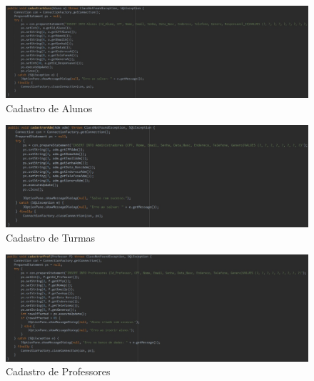 \documentclass[main.tex]{subfiles}
\begin{document}
\begin{figure}[H]
    \centering
    \hspace*{-2.82cm} %
    \centering
    \includegraphics[scale=0.6]{imagens/code_scrs/13-cadastrarAluno}
    \caption{Cadastro de Alunos}
\end{figure}

\begin{figure}[H]
    \centering
    \hspace*{-2.82cm} %
    \centering
    \includegraphics[scale=0.6]{imagens/code_scrs/15-cadastrarAdm}
    \caption{Cadastro de Turmas}
\end{figure}

\begin{figure}[H]
    \centering
    \hspace*{-2.82cm} %
    \centering
    \includegraphics[scale=0.6]{imagens/code_scrs/17-cadastrarProf}
    \caption{Cadastro de Professores}
\end{figure}
\end{document}
